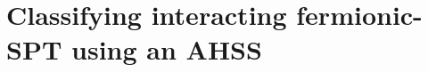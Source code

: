\documentclass[xcolor=table, aspectratio=169,ignorenonframetext]{beamer}
\begin{document}
\section{Classifying interacting fermionic-SPT using an AHSS}


\end{document}
